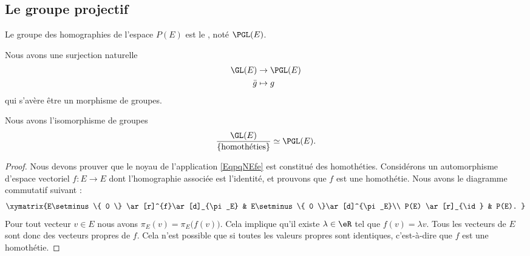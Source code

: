 \subsection{Le groupe projectif}

\begin{definition}      \label{DEFooWUSDooSLVKwV}
	Le groupe des homographies de l'espace \( P(E)\) est le , noté \( \PGL(E)\).
\end{definition}

Nous avons une surjection naturelle
\begin{equation}        \label{EqpqNEfe}
	\begin{aligned}
		\GL(E) & \to \PGL(E) \\
		\bar g & \mapsto g
	\end{aligned}
\end{equation}
qui s'avère être un morphisme de groupes.

\begin{proposition}
	Nous avons l'isomorphisme de groupes
	\begin{equation}
		\frac{ \GL(E) }{\{  \text{homothéties} \}}\simeq \PGL(E).
	\end{equation}

\end{proposition}

\begin{proof}
	Nous devons prouver que le noyau de l'application \eqref{EqpqNEfe} est constitué des homothéties. Considérons un automorphisme d'espace vectoriel \( f\colon E\to E\) dont l'homographie associée est l'identité, et prouvons que \( f\) est une homothétie. Nous avons le diagramme commutatif suivant :
	\begin{equation}
		\xymatrix{%
			E\setminus\{ 0 \} \ar[r]^{f}\ar[d]_{\pi_E}        &   E\setminus\{ 0 \}\ar[d]^{\pi_E}\\
			P(E) \ar[r]_{\id}   &   P(E).
		}
	\end{equation}
	Pour tout vecteur \( v\in E\) nous avons \( \pi_E(v)=\pi_E\big( f(v) \big)\). Cela implique qu'il existe \( \lambda\in\eR\) tel que \( f(v)=\lambda v\). Tous les vecteurs de \( E\) sont donc des vecteurs propres de \( f\). Cela n'est possible que si toutes les valeurs propres sont identiques, c'est-à-dire que \( f\) est une homothétie.
\end{proof}


